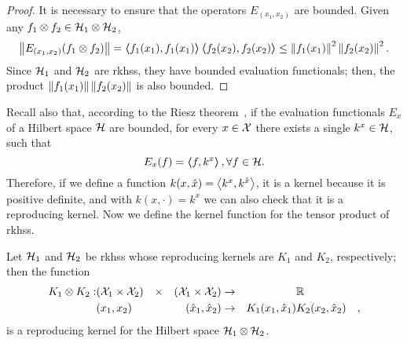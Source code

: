 \begin{proof}
    It is necessary to ensure that the operators $E_{(x_1, x_2)}$ are bounded. Given any $f_1 \otimes f_2 \in \mathcal{H}_1 \otimes \mathcal{H}_2$,
    $$ \left\lVert E_{(x_1, x_2)} (f_1 \otimes f_2)\right\rVert = \bm{\left\langle} f_1(x_1), f_1(x_1) \bm{\right\rangle} \bm{\left\langle} f_2(x_2), f_2(x_2) \bm{\right\rangle} \leq \left\lVert f_1(x_1)\right\rVert^2  \left\lVert f_2(x_2)\right\rVert^2 .$$
    Since $\mathcal{H}_1$ and $\mathcal{H}_2$ are \acrshort{rkhss}, they have bounded evaluation functionals; then, the product
    $ \left\lVert f_1(x_1)\right\rVert  \left\lVert f_2(x_2)\right\rVert $
    is also bounded.
\end{proof}
%
Recall also that, according to the Riesz theorem~\cite{Whittaker1991ACI}, if the evaluation functionals $E_x$ of a Hilbert space $\mathcal{H}$ are bounded, for every $x \in \mathcal{X}$ there exists a single $k^x \in \mathcal{H}$, such that 
$$ E_x(f) = \bm{\left\langle} f, k^x \bm{\right\rangle}, \forall f \in \mathcal{H} .$$
Therefore, if we define a function $k(x, \hat{x}) = \bm{\left\langle} k^x, k^{\hat{x}} \bm{\right\rangle}$, it is a kernel because it is positive definite, and with $k(x, \cdot) = k^x$ we can also check that it is a reproducing kernel.
%
Now we define the kernel function for the tensor product of \acrshort{rkhss}.
\begin{proposition}
    Let $\mathcal{H}_1$ and $\mathcal{H}_2$ be \acrshort{rkhss} whose reproducing kernels are $K_1$ and $K_2$, respectively;
    then the function
    \begin{equation}
        \nonumber
        \begin{aligned}
            K_1 \otimes K_2: & (\mathcal{X}_1 \times \mathcal{X}_2) & \times &  & (\mathcal{X}_1 \times \mathcal{X}_2) & \to &                     & \mathbb{R}              &   \\
                             & (x_1 , x_2)                  &        &  & (\hat{x}_1 , \hat{x}_2)      & \to & K_1(x_1, \hat{x}_1) & K_2(x_2, \hat{x}_2) & ,
        \end{aligned}
    \end{equation}
    is a reproducing kernel for the Hilbert space $\mathcal{H}_1 \otimes \mathcal{H}_2$.
\end{proposition}
